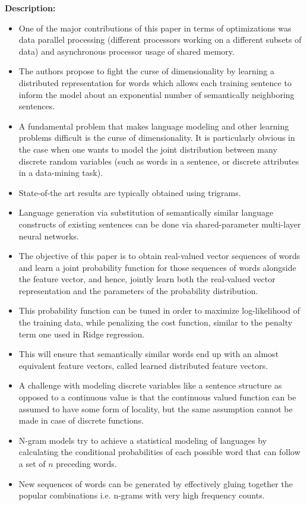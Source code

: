 \documentclass[11pt,a4paper]{article}
\begin{document}
  \textbf{Description:}
  \begin{itemize}
    \item
    One of the major contributions of this paper in terms of optimizations was data parallel processing (different processors working on a different subsets of data) and asynchronous processor usage of shared memory.
    \item
    The authors propose to fight the curse of dimensionality by learning a distributed representation for words which allows each training sentence to inform the model about an exponential number of semantically neighboring sentences.
    \item
    A fundamental problem that makes language modeling and other learning problems difficult is the curse of dimensionality. It is particularly obvious in the case when one wants to model the joint distribution between many discrete random variables (such as words in a sentence, or discrete attributes in a data-mining task).
    \item
    State-of-the art results are typically obtained using trigrams.
    \item
    Language generation via substitution of semantically similar language constructs of existing sentences can be done via shared-parameter multi-layer neural networks.
    \item
    The objective of this paper is to obtain real-valued vector sequences of words and learn a joint probability function for those sequences of words alongside the feature vector, and hence, jointly learn both the real-valued vector representation and the parameters of the probability distribution.
    \item
    This probability function can be tuned in order to maximize log-likelihood of the training data, while penalizing the cost function, similar to the penalty term one used in Ridge regression.
    \item
    This will ensure that semantically similar words end up with an almost equivalent feature vectors, called learned distributed feature vectors.
    \item
    A challenge with modeling discrete variables like a sentence structure as opposed to a continuous value is that the continuous valued function can be assumed to have some form of locality, but the same assumption cannot be made in case of discrete functions.
    \item
    N-gram models try to achieve a statistical modeling of languages by calculating the conditional probabilities of each possible word that can follow a set of $n$ preceding words.
    \item
    New sequences of words can be generated by effectively gluing together the popular combinations i.e. n-grams with very high frequency counts.
  \end{itemize}
\end{document}

